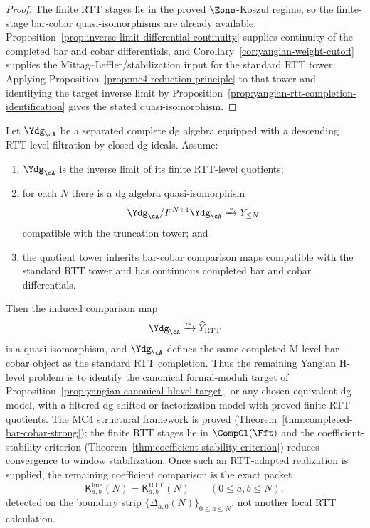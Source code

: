 \begin{proof}
The finite RTT stages lie in the proved $\Eone$-Koszul regime, so the
finite-stage bar-cobar quasi-isomorphisms are already available.
Proposition~\ref{prop:inverse-limit-differential-continuity} supplies
continuity of the completed bar and cobar differentials, and
Corollary~\ref{cor:yangian-weight-cutoff} supplies the
Mittag--Leffler/stabilization input for the standard RTT tower.
Applying Proposition~\ref{prop:mc4-reduction-principle} to that tower
and identifying the target inverse limit by
Proposition~\ref{prop:yangian-rtt-completion-identification} gives the
stated quasi-isomorphism.
\end{proof}

\begin{corollary}
\label{cor:yangian-hlevel-comparison-criterion}
Let $\Ydg_{\cA}$ be a separated complete dg algebra equipped with a
descending RTT-level filtration by closed dg ideals. Assume:
\begin{enumerate}
\item $\Ydg_{\cA}$ is the inverse limit of its finite RTT-level
 quotients;
\item for each $N$ there is a dg algebra quasi-isomorphism
 \[
 \Ydg_{\cA}/F^{N+1}\Ydg_{\cA} \xrightarrow{\sim} Y_{\le N}
 \]
 compatible with the truncation tower; and
\item the quotient tower inherits bar-cobar comparison maps compatible
 with the standard RTT tower and has continuous completed bar and cobar
 differentials.
\end{enumerate}
Then the induced comparison map
\[
\Ydg_{\cA} \xrightarrow{\sim} \widehat Y_{\mathrm{RTT}}
\]
is a quasi-isomorphism, and $\Ydg_{\cA}$ defines the same completed
M-level bar-cobar object as the standard RTT completion. Thus the
remaining Yangian H-level problem is to identify the canonical
formal-moduli target of
Proposition~\ref{prop:yangian-canonical-hlevel-target}, or any chosen
equivalent dg model, with a filtered dg-shifted or factorization model
with proved finite RTT quotients. The MC4 structural
framework is proved (Theorem~\ref{thm:completed-bar-cobar-strong});
the finite RTT stages lie in $\CompCl(\Fft)$ and the
coefficient-stability criterion
(Theorem~\ref{thm:coefficient-stability-criterion}) reduces
convergence to window stabilization. Once such an RTT-adapted
realization is supplied, the remaining coefficient
comparison is the exact packet
\[
\mathsf{K}^{\mathrm{line}}_{a,b}(N)
=\mathsf{K}^{\mathrm{RTT}}_{a,b}(N)
\qquad (0\le a,b\le N),
\]
detected on the boundary strip
$\{\Delta_{a,0}(N)\}_{0\le a\le N}$, not another local RTT
calculation.
\end{corollary}

